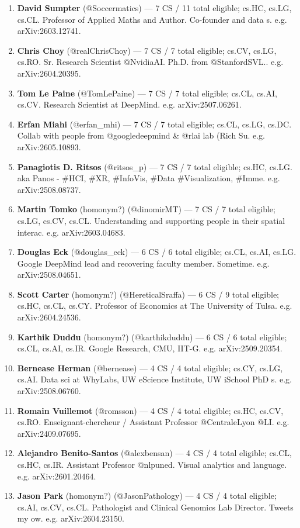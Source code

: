 \documentclass[twocolumn,10pt,letterpaper]{article}
\begin{document}
\begin{enumerate}
  \item \textbf{David Sumpter} (@Soccermatics) — 7 CS / 11 total eligible; cs.HC, cs.LG, cs.CL. Professor of Applied Maths and Author. Co-founder and data s. e.g. arXiv:2603.12741.
  \item \textbf{Chris Choy} (@realChrisChoy) — 7 CS / 7 total eligible; cs.CV, cs.LG, cs.RO. Sr. Research Scientist @NvidiaAI. Ph.D. from @StanfordSVL.. e.g. arXiv:2604.20395.
  \item \textbf{Tom Le Paine} (@TomLePaine) — 7 CS / 7 total eligible; cs.CL, cs.AI, cs.CV. Research Scientist at DeepMind. e.g. arXiv:2507.06261.
  \item \textbf{Erfan Miahi} (@erfan\_mhi) — 7 CS / 7 total eligible; cs.CL, cs.LG, cs.DC. Collab with people from @googledeepmind \& @rlai lab (Rich Su. e.g. arXiv:2605.10893.
  \item \textbf{Panagiotis D. Ritsos} (@ritsos\_p) — 7 CS / 7 total eligible; cs.HC, cs.LG. aka Panos - \#HCI, \#XR, \#InfoVis, \#Data \#Visualization, \#Imme. e.g. arXiv:2508.08737.
  \item \textbf{Martin Tomko} (homonym?) (@dinomirMT) — 7 CS / 7 total eligible; cs.LG, cs.CV, cs.CL. Understanding and supporting people in their spatial interac. e.g. arXiv:2603.04683.
  \item \textbf{Douglas Eck} (@douglas\_eck) — 6 CS / 6 total eligible; cs.CL, cs.AI, cs.LG. Google DeepMind lead and recovering faculty member. Sometime. e.g. arXiv:2508.04651.
  \item \textbf{Scott Carter} (homonym?) (@HereticalSraffa) — 6 CS / 9 total eligible; cs.HC, cs.CL, cs.CY. Professor of Economics at The University of Tulsa. e.g. arXiv:2604.24536.
  \item \textbf{Karthik Duddu} (homonym?) (@karthikduddu) — 6 CS / 6 total eligible; cs.CL, cs.AI, cs.IR. Google Research, CMU, IIT-G. e.g. arXiv:2509.20354.
  \item \textbf{Bernease Herman} (@bernease) — 4 CS / 4 total eligible; cs.CY, cs.LG, cs.AI. Data sci at WhyLabs, UW eScience Institute, UW iSchool PhD s. e.g. arXiv:2508.06760.
  \item \textbf{Romain Vuillemot} (@romsson) — 4 CS / 4 total eligible; cs.HC, cs.CV, cs.RO. Enseignant-chercheur / Assistant Professor @CentraleLyon @LI. e.g. arXiv:2409.07695.
  \item \textbf{Alejandro Benito-Santos} (@alexbensan) — 4 CS / 4 total eligible; cs.CL, cs.HC, cs.IR. Assistant Professor @nlpuned. Visual analytics and language. e.g. arXiv:2601.20464.
  \item \textbf{Jason Park} (homonym?) (@JasonPathology) — 4 CS / 4 total eligible; cs.AI, cs.CV, cs.CL. Pathologist and Clinical Genomics Lab Director. Tweets my ow. e.g. arXiv:2604.23150.

\end{enumerate}
\end{document}
